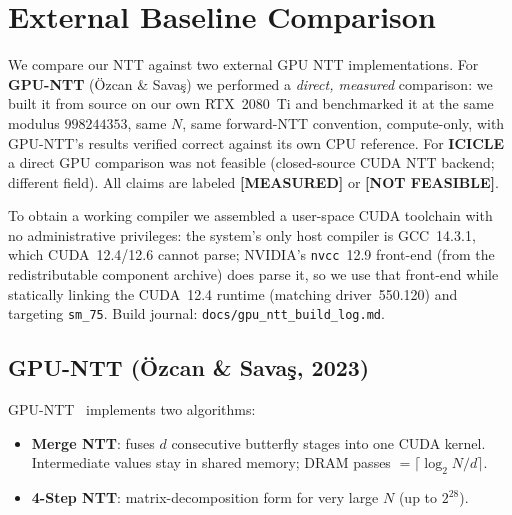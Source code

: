 \documentclass[11pt,a4paper]{article}
\begin{document}
\section{External Baseline Comparison}
\label{sec:external}

We compare our NTT against two external GPU NTT implementations. For \textbf{GPU-NTT}
(Özcan \& Savaş) we performed a \emph{direct, measured} comparison: we built it from source
on our own RTX~2080~Ti and benchmarked it at the same modulus $998244353$, same $N$, same
forward-NTT convention, compute-only, with GPU-NTT's results verified correct against its own
CPU reference. For \textbf{ICICLE} a direct GPU comparison was not feasible (closed-source CUDA
NTT backend; different field). All claims are labeled \textbf{[MEASURED]} or \textbf{[NOT FEASIBLE]}.

To obtain a working compiler we assembled a user-space CUDA toolchain with no administrative
privileges: the system's only host compiler is GCC~14.3.1, which CUDA~12.4/12.6 cannot parse;
NVIDIA's \texttt{nvcc}~12.9 front-end (from the redistributable component archive) does parse it,
so we use that front-end while statically linking the CUDA~12.4 runtime (matching driver~550.120)
and targeting \texttt{sm\_75}. Build journal: \texttt{docs/gpu\_ntt\_build\_log.md}.

\subsection{GPU-NTT (Özcan \& Savaş, 2023)}

GPU-NTT~\cite{gpuntt} implements two algorithms:
\begin{itemize}
  \item \textbf{Merge NTT}: fuses $d$ consecutive butterfly stages into one CUDA kernel.
    Intermediate values stay in shared memory; DRAM passes $= \lceil \log_2 N / d \rceil$.
  \item \textbf{4-Step NTT}: matrix-decomposition form for very large $N$ (up to $2^{28}$).
\end{itemize}
\end{document}
